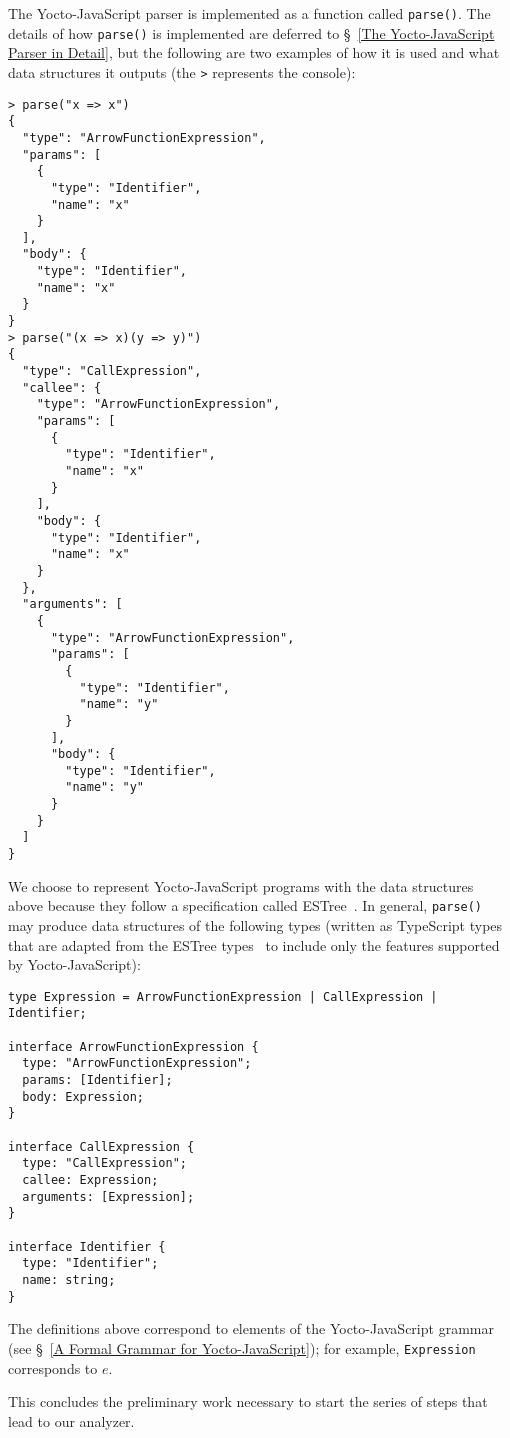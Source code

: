 \documentclass[12pt, oneside]{book}
\begin{document}
The Yocto-JavaScript parser is implemented as a function called \texttt{parse()}. The details of how \texttt{parse()} is implemented are deferred to §~\ref{The Yocto-JavaScript Parser in Detail}, but the following are two examples of how it is used and what data structures it outputs (the \texttt{>} represents the console):

\begin{verbatim}
> parse("x => x")
{
  "type": "ArrowFunctionExpression",
  "params": [
    {
      "type": "Identifier",
      "name": "x"
    }
  ],
  "body": {
    "type": "Identifier",
    "name": "x"
  }
}
> parse("(x => x)(y => y)")
{
  "type": "CallExpression",
  "callee": {
    "type": "ArrowFunctionExpression",
    "params": [
      {
        "type": "Identifier",
        "name": "x"
      }
    ],
    "body": {
      "type": "Identifier",
      "name": "x"
    }
  },
  "arguments": [
    {
      "type": "ArrowFunctionExpression",
      "params": [
        {
          "type": "Identifier",
          "name": "y"
        }
      ],
      "body": {
        "type": "Identifier",
        "name": "y"
      }
    }
  ]
}
\end{verbatim}

We choose to represent Yocto-JavaScript programs with the data structures above because they follow a specification called ESTree~\cite{estree}. In general, \texttt{parse()} may produce data structures of the following types (written as TypeScript types that are adapted from the ESTree types~\cite{estree-types} to include only the features supported by Yocto-JavaScript):

\begin{verbatim}
type Expression = ArrowFunctionExpression | CallExpression | Identifier;

interface ArrowFunctionExpression {
  type: "ArrowFunctionExpression";
  params: [Identifier];
  body: Expression;
}

interface CallExpression {
  type: "CallExpression";
  callee: Expression;
  arguments: [Expression];
}

interface Identifier {
  type: "Identifier";
  name: string;
}
\end{verbatim}

The definitions above correspond to elements of the Yocto-JavaScript grammar (see §~\ref{A Formal Grammar for Yocto-JavaScript}); for example, \texttt{Expression} corresponds to $e$.

This concludes the preliminary work necessary to start the series of steps that lead to our analyzer.
\end{document}
